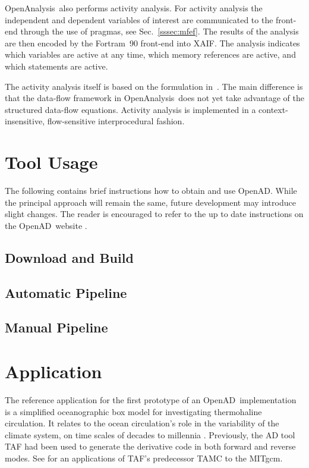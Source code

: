 \documentclass[11pt]{article}
\newcommand{\OpenAD}{OpenAD}
\newcommand{\OpenAnalysis}{OpenAnalysis}
\newcommand{\xaif}{XAIF}
\newcommand{\refsec}[1]{{Sec.~\ref{#1}}}
\begin{document}
\OpenAnalysis\ also performs activity analysis.  For activity analysis
the independent and dependent variables of interest are communicated
to the front-end through the use of pragmas, see \refsec{sssec:mfef}.
The results of the analysis are then encoded by the Fortram~90
front-end into \xaif.  The analysis indicates which variables are
active at any time, which memory references are active, and which
statements are active.

The activity analysis itself is based on the formulation in~\cite{HNP02}.
The main difference is that the data-flow framework in \OpenAnalysis\ does not
yet take advantage of the structured data-flow equations.  Activity analysis is
implemented in a context-insensitive, flow-sensitive interprocedural fashion.


\section{Tool Usage}
The following contains brief instructions how to obtain and use \OpenAD. 
While the principal approach will remain the same, future development may 
introduce slight changes. The reader is encouraged to refer to the 
up to date instructions on the \OpenAD\ website \cite{openadWeb}.
\subsection{Download and Build} 
\subsection{Automatic Pipeline}
\subsection{Manual Pipeline}\label{ssec:manualPipeline}


\section{Application}

The reference application for the first prototype of an \OpenAD\ implementation
is a simplified oceanographic box model for investigating
thermohaline circulation. It relates to the
ocean circulation's role in the variability of the climate system,
on time scales of decades to millennia \cite{tzi-ioa:02}.
Previously, the AD tool TAF \cite{GiKa02} 
had been used to generate the derivative
code in both forward and reverse modes.
See \cite{maro-eta:99} for an applications of
TAF's predecessor TAMC to the MITgcm.
\end{document}

